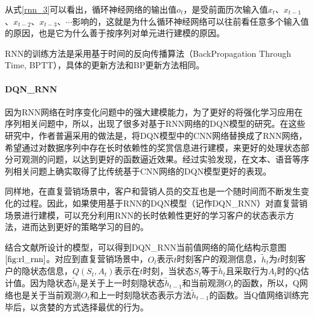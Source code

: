 从式\eqref{rnn_3}可以看出，循环神经网络的输出值$o_{t}$，是受前面历次输入值$x_{t}$、$x_{t-1}$、$x_{t-2}$、$x_{t-3}$、$\cdots$影响的，这就是为什么循环神经网络可以往前看任意多个输入值的原因，也是它为什么善于按序列对单元进行建模的原因。

RNN的训练方法是采用基于时间的反向传播算法（BackPropagation Through Time, BPTT），具体的更新方法和BP更新方法相同。

 \paragraph{DQN_RNN}
 因为RNN网络在时序变化问题中的强大建模能力，为了更好的将强化学习应用在序列相关问题中，所以，出现了很多对基于RNN网络的DQN模型的研究\citep{hausknecht2015deep,narasimhan2015language}。在这些研究中，作者普遍采用的做法是，将DQN模型中的CNN网络替换成了RNN网络，希望通过对数据序列中存在长时依赖性的奖赏信息进行建模，来更好的处理状态部分可观测的问题\citep{bakker2002reinforcement,hausknecht2015deep,lin1993reinforcement,narasimhan2015language}，以达到更好的函数逼近效果。经过实验发现，在文本、语音等序列相关问题上确实取得了比传统基于CNN网络的DQN模型更好的表现。

 同样地，在直复营销场景中，客户和营销人员的交互也是一个随时间而不断发生变化的过程。因此，如果使用基于RNN的DQN模型（记作DQN_RNN）对直复营销场景进行建模，可以充分利用RNN的长时依赖性更好的学习客户的状态表示方法，进而达到更好的策略学习的目的。

 结合文献\citep{hausknecht2015deep,narasimhan2015language}所设计的模型，可以得到DQN_RNN当前值网络的简化结构示意图$\ref{fig:rl_rnn}$。对应到直复营销场景中，$O_{t}$表示$t$时刻客户的观测信息，$\tilde{h}_{t}$为$t$时刻客户的隐状态信息，$Q(S_{t}, A_{t})$表示在$t$时刻，当状态$S_{t}$等于$\tilde{h}_{t}$且采取行为$A_{t}$时的Q估计值。因为隐状态$\tilde{h}_{t}$是关于上一时刻隐状态$\tilde{h}_{t-1}$和当前观测$O_{t}$的函数，所以，Q网络也是关于当前观测$O_{t}$和上一时刻隐状态表示方法$\tilde{h}_{t-1}$的函数。当Q值网络训练完毕后，以贪婪的方式选择最优的行为。

